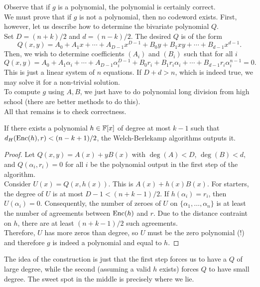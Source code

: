 			Observe that if $g$ is a polynomial, the polynomial is certainly correct.\\
			We must prove that if $g$ is not a polynomial, then no codeword exists. First, however, let us describe how to determine the bivariate polynomial $Q$.\\
			Set $D = (n+k)/2$ and $d = (n-k)/2$. The desired $Q$ is of the form
			\[ Q(x,y) = A_0 + A_1 x + \cdots + A_{D-1} x^{D-1} + B_0y + B_1xy + \cdots + B_{d-1} x^{d-1}. \]
			Then, we wish to determine coefficients $(A_i)$ and $(B_i)$ such that for all $i$
			\[ Q(x,y) = A_0 + A_1 \alpha_i + \cdots + A_{D-1} \alpha_i^{D-1} + B_0 r_i + B_1 r_i\alpha_i + \cdots + B_{d-1} r_i\alpha_i^{n-1} = 0. \]
			This is just a linear system of $n$ equations. If $D+d > n$, which is indeed true, we may solve it for a non-trivial solution.\\
			To compute $g$ using $A,B$, we just have to do polynomial long division from high school (there are better methods to do this).\\
			All that remains is to check correctness.

			\begin{ftheo}
				If there exists a polynomial $h \in \mathbb{F}[x]$ of degree at most $k-1$ such that $d_H(\operatorname{Enc}(h),r) < (n-k+1)/2$, the Welch-Berlekamp algorithms outputs it.
			\end{ftheo}
			\begin{proof}
				Let $Q(x,y) = A(x) + yB(x)$ with $\deg(A) < D$, $\deg(B) < d$, and $Q(\alpha_i,r_i) = 0$ for all $i$ be the polynomial output in the first step of the algorithm.\\

				Consider $U(x) = Q(x,h(x))$. This is $A(x) + h(x) B(x)$. For starters, the degree of $U$ is at most $D-1 < (n+k-1)/2$. If $h(\alpha_i) = r_i$, then $U(\alpha_i) = 0$. Consequently, the number of zeroes of $U$ on $\{\alpha_1,\ldots,\alpha_n\}$ is at least the number of agreements between $\operatorname{Enc}(h)$ and $r$. Due to the distance contraint on $h$, there are at least $(n+k-1)/2$ such agreements.\\
				Therefore, $U$ has more zeros than degree, so $U$ must be the zero polynomial (!) and therefore $g$ is indeed a polynomial and equal to $h$.
			\end{proof}
			The idea of the construction is just that the first step forces us to have a $Q$ of large degree, while the second (assuming a valid $h$ exists) forces $Q$ to have small degree. The sweet spot in the middle is precisely where we lie.\\

